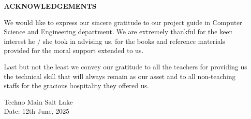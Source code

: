 
\thispagestyle{plain}

\vspace*{\fill} %

\begin{center}
    \LARGE {\bf \uppercase{Acknowledgements}}
   \end{center}
   
   \vspace{0.5\baselineskip}
   
   \noindent
   We would like to express our sincere gratitude to our project guide in Computer Science and Engineering department. We are extremely thankful for the keen interest he / she took in advising us, for the books and reference materials provided for the moral support extended to us.
   
   
   \vspace{\baselineskip}
   \noindent
   Last but not the least we convey our gratitude to all the teachers for providing us the technical skill that will always remain as our asset and to all non-teaching staffs for the gracious hospitality they offered us.

\vspace{-0.5cm}


\hspace{1.0\baselineskip}

\begin{flushright}

\vspace{2.5\baselineskip}
\textls[90]{\textbf{\mynameone ~(\myrollnoone)}}

\vspace{3\baselineskip}
\textls[90]{\textbf{\mynametwo ~(\myrollnotwo)}}

\vspace{3\baselineskip}
\textls[90]{\textbf{\mynamethree ~(\myrollnothree)}}

\vspace{3\baselineskip}
\textls[90]{\textbf{\mynamefour ~(\myrollnofour)}}

\end{flushright}



\noindent
Techno Main Salt Lake \\
Date: 12th June, 2025

\vspace*{\fill} %